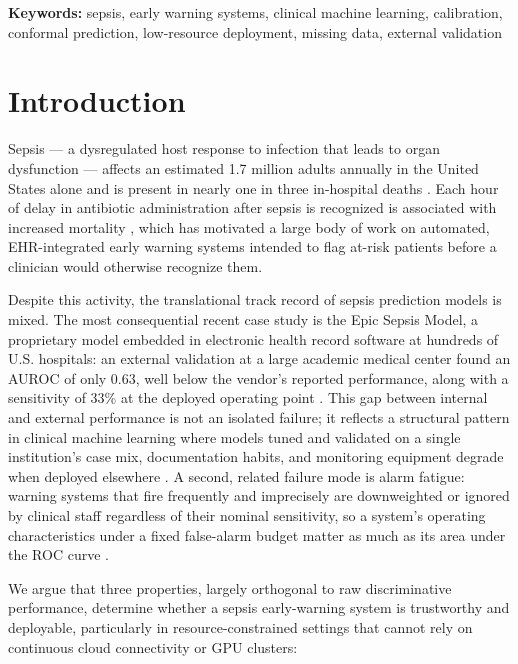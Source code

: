 \documentclass[11pt]{article}
\begin{document}
\noindent\textbf{Keywords:} sepsis, early warning systems, clinical machine learning, calibration, conformal prediction, low-resource deployment, missing data, external validation

\clearpage
\setcounter{tocdepth}{2}
\tableofcontents
\clearpage

\section{Introduction}
\label{sec:intro}

Sepsis --- a dysregulated host response to infection that leads to organ dysfunction \citep{singer2016sepsis3} --- affects an estimated 1.7 million adults annually in the United States alone \citep{rhee2017incidence} and is present in nearly one in three in-hospital deaths \citep{rhee2019prevalence}. Each hour of delay in antibiotic administration after sepsis is recognized is associated with increased mortality \citep{seymour2017time}, which has motivated a large body of work on automated, EHR-integrated early warning systems intended to flag at-risk patients before a clinician would otherwise recognize them.

Despite this activity, the translational track record of sepsis prediction models is mixed. The most consequential recent case study is the Epic Sepsis Model, a proprietary model embedded in electronic health record software at hundreds of U.S. hospitals: an external validation at a large academic medical center found an AUROC of only 0.63, well below the vendor's reported performance, along with a sensitivity of 33\% at the deployed operating point \citep{wong2021external, habib2021epic}. This gap between internal and external performance is not an isolated failure; it reflects a structural pattern in clinical machine learning where models tuned and validated on a single institution's case mix, documentation habits, and monitoring equipment degrade when deployed elsewhere \citep{rajkomar2019machine, obermeyer2019dissecting}. A second, related failure mode is alarm fatigue: warning systems that fire frequently and imprecisely are downweighted or ignored by clinical staff regardless of their nominal sensitivity, so a system's operating characteristics under a fixed false-alarm budget matter as much as its area under the ROC curve \citep{sendak2020real}.

We argue that three properties, largely orthogonal to raw discriminative performance, determine whether a sepsis early-warning system is trustworthy and deployable, particularly in resource-constrained settings that cannot rely on continuous cloud connectivity or GPU clusters:
\end{document}
